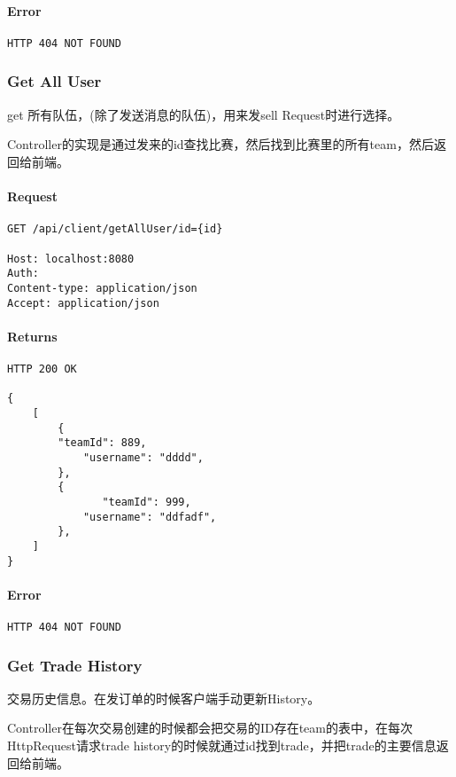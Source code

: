 \documentclass{article}
\begin{document}
				\paragraph*{Error}
\begin{lstlisting}
HTTP 404 NOT FOUND
\end{lstlisting}

			\subsubsection{Get All User}
				get 所有队伍，(除了发送消息的队伍)，用来发sell Request时进行选择。

                Controller的实现是通过发来的id查找比赛，然后找到比赛里的所有team，然后返回给前端。
					\paragraph*{Request}
\begin{lstlisting}
GET /api/client/getAllUser/id={id}

Host: localhost:8080
Auth:
Content-type: application/json
Accept: application/json

\end{lstlisting}
					\paragraph*{Returns}
\begin{lstlisting}
HTTP 200 OK

{
    [
        {
        "teamId": 889,
            "username": "dddd",
        },
        {
               "teamId": 999,
            "username": "ddfadf",
        },
    ]
}
\end{lstlisting}
					\paragraph*{Error}
\begin{lstlisting}
HTTP 404 NOT FOUND
\end{lstlisting}

				\subsubsection{Get Trade History}
					交易历史信息。在发订单的时候客户端手动更新History。

                    Controller在每次交易创建的时候都会把交易的ID存在team的表中，在每次HttpRequest请求trade history的时候就通过id找到trade，并把trade的主要信息返回给前端。
\end{document}
